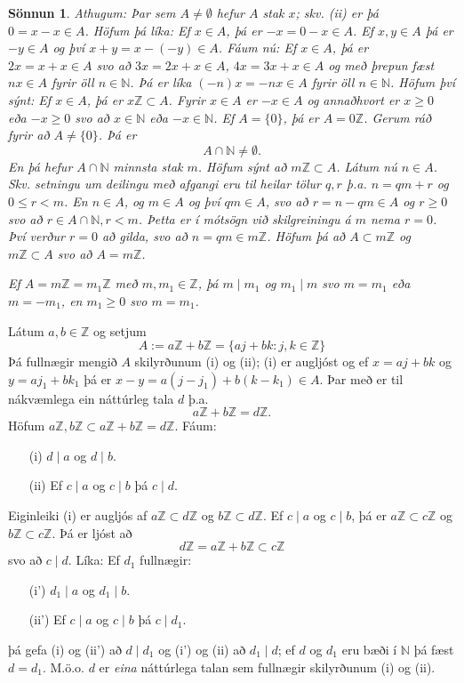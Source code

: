 \documentclass[a4paper,icelandic,11pt]{book}
\theoremstyle{plain}
\newtheorem*{sonnun}{Sönnun}
\newcommand{\N}{\mathbb{N}}
\newcommand{\Z}{\mathbb{Z}}
\begin{document}
\begin{sonnun}
  Athugum: Þar sem $A\neq \emptyset$ hefur $A$ stak $x$; skv. (ii) er þá $0 =
  x-x\in A$. Höfum þá líka: Ef $x\in A$, þá er $-x = 0 -x \in A$. Ef $x,y\in
  A$ þá er $-y\in A$ og því $x+y = x-(-y)\in A$. Fáum nú: Ef $x\in A$, þá er
  $2x = x+ x \in A$ svo að $3x = 2x + x \in A$, $4x = 3x + x \in A$ og með
  þrepun fæst $nx \in A$ fyrir öll $n\in\N$. Þá er líka $(-n)x = -nx \in A$
  fyrir öll $n\in\N$. Höfum því sýnt: Ef $x\in A$, þá er $x\Z \subset A$.
  Fyrir $x\in A$ er $-x\in A$ og annaðhvort er $x\ge 0$ eða $-x \ge 0$ svo
  að $x\in\N$ eða $-x\in\N$. Ef $A=\{0\}$, þá er $A=0\Z$. Gerum ráð fyrir að
  $A\neq \{0\}$. Þá er
  \[ A \cap \N \neq \emptyset . \]
  En þá hefur $A\cap\N$ minnsta stak $m$. Höfum sýnt að $m\Z\subset A$. Látum
  nú $n\in A$. Skv. setningu um deilingu með afgangi eru til heilar tölur
  $q,r$ þ.a. $n=qm+r$ og $0\le r < m$. En $n\in A$, og $m\in A$ og því $qm\in
  A$, svo að $r = n - qm \in A$ og $r\ge 0$ svo að $r\in A\cap \N, r < m$.
  Þetta er í mótsögn við skilgreiningu á $m$ nema $r=0$. Því verður $r = 0$ að
  gilda, svo að $n = qm \in m\Z$. Höfum þá að $A\subset m\Z$ og $m\Z \subset
  A$ svo að $A = m\Z$.

  Ef $A = m\Z = m_1 \Z$ með $m,m_1 \in \Z$, þá $m \mid m_1$ og $m_1 \mid m$ svo $m =
  m_1$ eða $m = -m_1$, en $m_1 \ge 0$ svo $m = m_1$.
\end{sonnun}
Látum $a,b\in\Z$ og setjum
\[ A:= a\Z + b\Z = \{ aj + bk : j,k \in \Z \} \]
Þá fullnægir mengið $A$ skilyrðunum (i) og (ii); (i) er augljóst og ef $x = aj
+ bk$ og $y = aj_1 + bk_1$ þá er $x-y = a(j-j_1) + b(k-k_1) \in A$. Þar með er
til nákvæmlega ein náttúrleg tala $d$ þ.a.
\[ a\Z + b\Z = d\Z . \]
Höfum $a\Z, b\Z \subset a\Z + b\Z = d\Z$. Fáum:
\begin{itemize}
  \item [(i)] $d\mid a$ og $d\mid b$.
  \item [(ii)] Ef $c\mid a$ og $c\mid b$ þá $c\mid d$.
\end{itemize}
Eiginleiki (i) er augljós af $a\Z \subset d\Z$ og $b\Z \subset d\Z$. Ef $c\mid a$
og $c\mid b$, þá er $a\Z \subset c\Z$ og $b\Z \subset c\Z$. Þá er ljóst að
\[ d\Z = a\Z + b\Z \subset c\Z \]
svo að $c\mid d$. Líka: Ef $d_1$ fullnægir:
\begin{itemize}
  \item [(i')] $d_1 \mid a$ og $d_1 \mid b$.
  \item [(ii')] Ef $c\mid a$ og $c\mid b$ þá $c\mid d_1$.
\end{itemize}
þá gefa (i) og (ii') að $d\mid d_1$ og (i') og (ii) að $d_1 \mid d$; ef $d$ og $d_1$
eru bæði í $\N$ þá fæst $d=d_1$. M.ö.o. $d$ er \emph{eina} náttúrlega talan
sem fullnægir skilyrðunum (i) og (ii).
\end{document}
